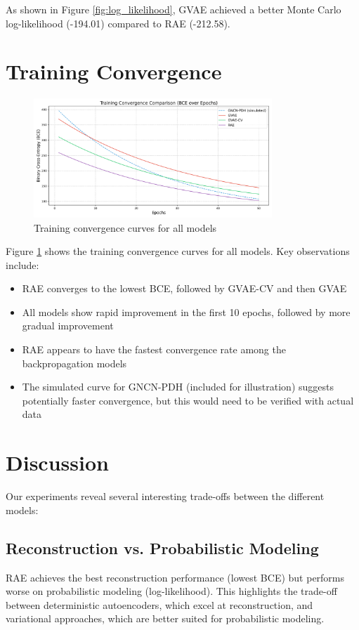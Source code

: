 \documentclass[11pt,a4paper]{article}
\begin{document}
As shown in Figure \ref{fig:log_likelihood}, GVAE achieved a better Monte Carlo log-likelihood (-194.01) compared to RAE (-212.58).

\section{Training Convergence}

\begin{figure}[H]
    \centering
    \includegraphics[width=0.8\textwidth]{comparison_results/training_curves_comparison.png}
    \caption{Training convergence curves for all models}
    \label{fig:training_curves}
\end{figure}

Figure \ref{fig:training_curves} shows the training convergence curves for all models. Key observations include:
\begin{itemize}
    \item RAE converges to the lowest BCE, followed by GVAE-CV and then GVAE
    \item All models show rapid improvement in the first 10 epochs, followed by more gradual improvement
    \item RAE appears to have the fastest convergence rate among the backpropagation models
    \item The simulated curve for GNCN-PDH (included for illustration) suggests potentially faster convergence, but this would need to be verified with actual data
\end{itemize}

\section{Discussion}

Our experiments reveal several interesting trade-offs between the different models:

\subsection{Reconstruction vs. Probabilistic Modeling}
RAE achieves the best reconstruction performance (lowest BCE) but performs worse on probabilistic modeling (log-likelihood). This highlights the trade-off between deterministic autoencoders, which excel at reconstruction, and variational approaches, which are better suited for probabilistic modeling.
\end{document}
